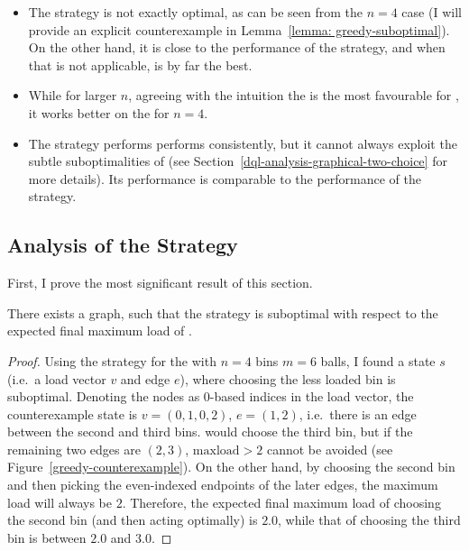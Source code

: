 \begin{itemize}
    \item The \Greedy strategy is not exactly optimal, as can be seen from the $n=4$ case (I will provide an explicit counterexample in Lemma~\ref{lemma: greedy-suboptimal}). On the other hand, it is close to the performance of the \DP strategy, and when that is not applicable, \Greedy is by far the best.
    \item While for larger $n$, agreeing with the intuition the \CompleteGraph is the most favourable for \Greedy, it works better on the \CycleGraph for $n=4$. 
    \item The \DQN strategy performs performs consistently, but it cannot always exploit the subtle suboptimalities of \Greedy (see Section~\ref{dql-analysis-graphical-two-choice} for more details). Its performance is comparable to the performance of the \LocalRewardOptimiser strategy.
    
\end{itemize}


\subsection{Analysis of the \Greedy Strategy}

First, I prove the most significant result of this section.

\begin{lemma} \label{lemma: greedy-suboptimal}
There exists a graph, such that the \Greedy strategy is suboptimal with respect to the expected final maximum load of \GraphicalTwoChoice.
\end{lemma}

\begin{proof}
Using the \DP strategy for the \CycleGraph with $n=4$ bins $m=6$ balls, I found a state $s$ (i.e.\ a load vector $v$ and edge $e$), where choosing the less loaded bin is suboptimal. Denoting the nodes as $0$-based indices in the load vector, the counterexample state is $v=(0,1,0,2)$,  $e=(1,2)$, i.e.\ there is an edge between the second and third bins. \Greedy would choose the third bin, but if the remaining two edges are $(2,3)$, $\mathrm{maxload}>2$ cannot be avoided (see Figure~\ref{greedy-counterexample}). On the other hand, by choosing the second bin and then picking the even-indexed endpoints of the later edges, the maximum load will always be $2$. Therefore, the expected final maximum load of choosing the second bin (and then acting optimally) is $2.0$, while that of choosing the third bin is between $2.0$ and $3.0$.
\end{proof}



